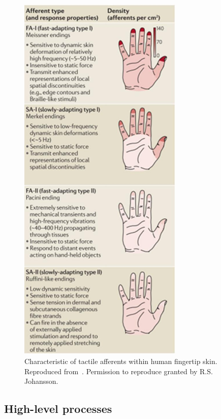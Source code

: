 \begin{figure}[]
	\centering
	\includegraphics[width=0.7\textwidth]{images/tactile_afferents}
	\caption{Characteristic of tactile afferents within human fingertip skin.
Reproduced from~\cite{johansson2009coding}. Permission to reproduce granted by R.S. Johansson.}
	\label{fig:tactile_afferents}
\end{figure}

\subsection{High-level processes}
\label{high_level_processes}

